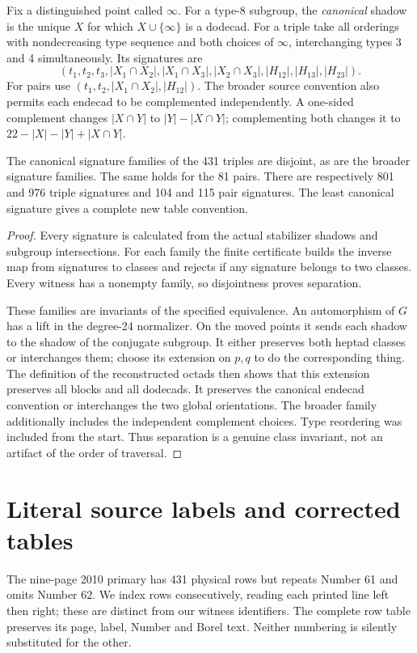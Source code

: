 \documentclass[11pt,a4paper]{article}
\begin{document}
Fix a distinguished point called $\infty$. For a type-8 subgroup, the \emph{canonical} shadow is the unique $X$ for which $X\cup\{\infty\}$ is a dodecad. For a triple take all orderings with nondecreasing type sequence and both choices of $\infty$, interchanging types 3 and 4 simultaneously. Its signatures are
\begin{equation}\label{eq:signature}
(t_1,t_2,t_3,|X_1\cap X_2|,|X_1\cap X_3|,|X_2\cap X_3|,
 |H_{12}|,|H_{13}|,|H_{23}|).
\end{equation}
For pairs use $(t_1,t_2,|X_1\cap X_2|,|H_{12}|)$. The broader source convention also permits each endecad to be complemented independently. A one-sided complement changes $|X\cap Y|$ to $|Y|-|X\cap Y|$; complementing both changes it to $22-|X|-|Y|+|X\cap Y|$.

\begin{proposition}\label{prop:coordinates}
The canonical signature families of the 431 triples are disjoint, as are the broader signature families. The same holds for the 81 pairs. There are respectively 801 and 976 triple signatures and 104 and 115 pair signatures. The least canonical signature gives a complete new table convention.
\end{proposition}
\begin{proof}
Every signature is calculated from the actual stabilizer shadows and subgroup intersections. For each family the finite certificate builds the inverse map from signatures to classes and rejects if any signature belongs to two classes. Every witness has a nonempty family, so disjointness proves separation.

These families are invariants of the specified equivalence. An automorphism of $G$ has a lift in the degree-24 normalizer. On the moved points it sends each shadow to the shadow of the conjugate subgroup. It either preserves both heptad classes or interchanges them; choose its extension on $p,q$ to do the corresponding thing. The definition of the reconstructed octads then shows that this extension preserves all blocks and all dodecads. It preserves the canonical endecad convention or interchanges the two global orientations. The broader family additionally includes the independent complement choices. Type reordering was included from the start. Thus separation is a genuine class invariant, not an artifact of the order of traversal.
\end{proof}

\section{Literal source labels and corrected tables}
The nine-page 2010 primary has 431 physical rows but repeats Number 61 and omits Number 62. We index rows consecutively, reading each printed line left then right; these are distinct from our witness identifiers. The complete row table preserves its page, label, Number and Borel text. Neither numbering is silently substituted for the other.
\end{document}
